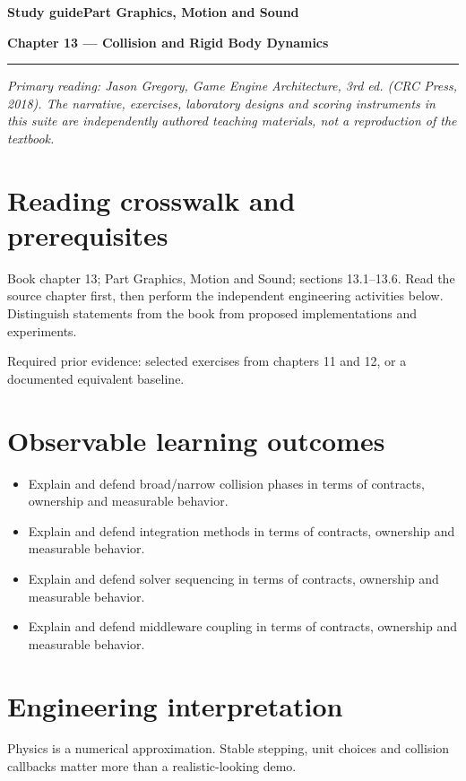\documentclass[11pt,letterpaper]{article}
\newcommand{\DocType}{Reference}
\newcommand{\SuiteHeading}[3]{%
\renewcommand{\DocType}{#2}%
{\small\bfseries\sffamily\color{EngineTeal}#2\hfill #3}\par\vspace{6pt}
{\LARGE\bfseries\color{EngineBlue}#1}\par\vspace{4pt}
{\color{EngineTeal}\rule{\linewidth}{1pt}}\par\vspace{7pt}}
\newcommand{\SourceNote}{\footnotesize\textit{Primary reading: Jason Gregory, \emph{Game Engine Architecture}, 3rd ed. (CRC Press, 2018). The narrative, exercises, laboratory designs and scoring instruments in this suite are independently authored teaching materials, not a reproduction of the textbook.}\normalsize\par}
\begin{document}
\SuiteHeading{Chapter 13 — Collision and Rigid Body Dynamics}{Study guide}{Part Graphics, Motion and Sound}
\SourceNote
\section{Reading crosswalk and prerequisites}
Book chapter 13; Part Graphics, Motion and Sound; sections 13.1--13.6. Read the source chapter first, then perform the independent engineering activities below. Distinguish statements from the book from proposed implementations and experiments.

Required prior evidence: selected exercises from chapters 11 and 12, or a documented equivalent baseline.

\section{Observable learning outcomes}
\begin{itemize}
\item Explain and defend broad/narrow collision phases in terms of contracts, ownership and measurable behavior.
\item Explain and defend integration methods in terms of contracts, ownership and measurable behavior.
\item Explain and defend solver sequencing in terms of contracts, ownership and measurable behavior.
\item Explain and defend middleware coupling in terms of contracts, ownership and measurable behavior.
\end{itemize}
\section{Engineering interpretation}
Physics is a numerical approximation. Stable stepping, unit choices and collision callbacks matter more than a realistic-looking demo.
\end{document}
